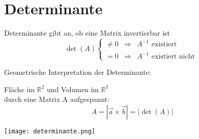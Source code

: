 

\section{Determinante}

    \begin{definition}{Determinante}
        gibt an, ob eine Matrix invertierbar ist
        \begin{equation*}
            \det(A)
            \left\{
                \begin{array}{lll}
                    \neq 0   &\Rightarrow    & A^{-1} \text{ existiert }\\
                    = 0     &\Rightarrow    & A^{-1} \text{ existiert nicht }
                \end{array}
            \right.
        \end{equation*}
    \end{definition}

    

    \begin{definition}{Geometrische Interpretation} der Determinante:\\
        \begin{minipage}{0.7\linewidth}
        Fläche im $\mathbb{R}^2$ und Volumen im $\mathbb{R}^3$\\
        durch eine Matrix A aufgespannt:
        $$A = |\vec{a} \times \vec{b}| = |\det(A)|$$
        \end{minipage}
        \begin{minipage}{0.25\linewidth}
            \texttt{[image: determinante.png]}
        \end{minipage}
    \end{definition}

   
    
